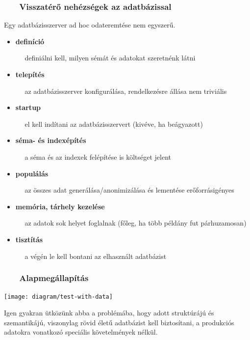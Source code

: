 \documentclass[
]{beamer}
\newcommand{\slidetitle}[2]{\frametitle{{\small #1 ~ \ding{226} ~ } \normalsize \textbf{#2} }}
\begin{document}
\begin{frame}
    \slidetitle{\sectionshorttitle}{Visszatérő nehézségek az adatbázissal}

    
    Egy adatbázisszerver ad hoc odateremtése nem egyszerű. \par
    
    \vspace{0.5em}

    \begin{itemize}
        \item \textbf{definíció} \par
            { \small ~~ definiálni kell, milyen sémát és adatokat szeretnénk látni }
        \item \textbf{telepítés} \par
            { \small ~~ az adatbázisszerver konfigurálása, rendelkezésre állása nem triviális }
        \item \textbf{startup} \par
            { \small ~~ el kell indítani az adatbázisszervert (kivéve, ha beágyazott) }
        \item \textbf{séma- és indexépítés} \par
            { \small ~~ a séma és az indexek felépítése is költséget jelent }
        \item \textbf{populálás} \par
            { \small ~~ az összes adat generálása/anonimizálása és lementése erőforrásigényes }
        \item \textbf{memória, tárhely kezelése} \par
            { \small ~~ az adatok sok helyet foglalnak (főleg, ha több példány fut párhuzamosan) }
        \item \textbf{tisztítás} \par
            { \small ~~ a végén le kell bontani az elhasznált adatbázist }
    \end{itemize}
\end{frame}

\begin{frame}
    \slidetitle{\sectionshorttitle}{Alapmegállapítás}
    
    \centering
    
    \texttt{[image: diagram/test-with-data]}
    
    \vspace{1cm}
    
    \begin{minipage}[b]{0.8\textwidth}
        \justifying
        Igen gyakran ütközünk abba a problémába,
        hogy adott struktúrájú és szemantikájú,
        viszonylag rövid életű adatbázist kell biztosítani,
        a produkciós adatokra vonatkozó speciális követelmények nélkül.
    \end{minipage}
\end{frame}
\end{document}

